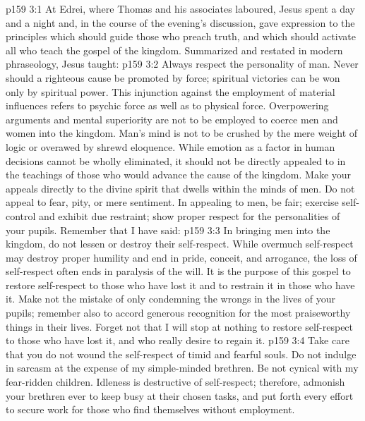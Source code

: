 \vs p159 3:1 At Edrei, where Thomas and his associates laboured, Jesus spent a day and a night and, in the course of the evening’s discussion, gave expression to the principles which should guide those who preach truth, and which should activate all who teach the gospel of the kingdom. Summarized and restated in modern phraseology, Jesus taught:
\vs p159 3:2 \pc Always respect the personality of man. Never should a righteous cause be promoted by force; spiritual victories can be won only by spiritual power. This injunction against the employment of material influences refers to psychic force as well as to physical force. Overpowering arguments and mental superiority are not to be employed to coerce men and women into the kingdom. Man’s mind is not to be crushed by the mere weight of logic or overawed by shrewd eloquence. While emotion as a factor in human decisions cannot be wholly eliminated, it should not be directly appealed to in the teachings of those who would advance the cause of the kingdom. Make your appeals directly to the divine spirit that dwells within the minds of men. Do not appeal to fear, pity, or mere sentiment. In appealing to men, be fair; exercise self\hyp{}control and exhibit due restraint; show proper respect for the personalities of your pupils. Remember that I have said: 
\vs p159 3:3 In bringing men into the kingdom, do not lessen or destroy their self\hyp{}respect. While overmuch self\hyp{}respect may destroy proper humility and end in pride, conceit, and arrogance, the loss of self\hyp{}respect often ends in paralysis of the will. It is the purpose of this gospel to restore self\hyp{}respect to those who have lost it and to restrain it in those who have it. Make not the mistake of only condemning the wrongs in the lives of your pupils; remember also to accord generous recognition for the most praiseworthy things in their lives. Forget not that I will stop at nothing to restore self\hyp{}respect to those who have lost it, and who really desire to regain it.
\vs p159 3:4 Take care that you do not wound the self\hyp{}respect of timid and fearful souls. Do not indulge in sarcasm at the expense of my simple\hyp{}minded brethren. Be not cynical with my fear\hyp{}ridden children. Idleness is destructive of self\hyp{}respect; therefore, admonish your brethren ever to keep busy at their chosen tasks, and put forth every effort to secure work for those who find themselves without employment.
